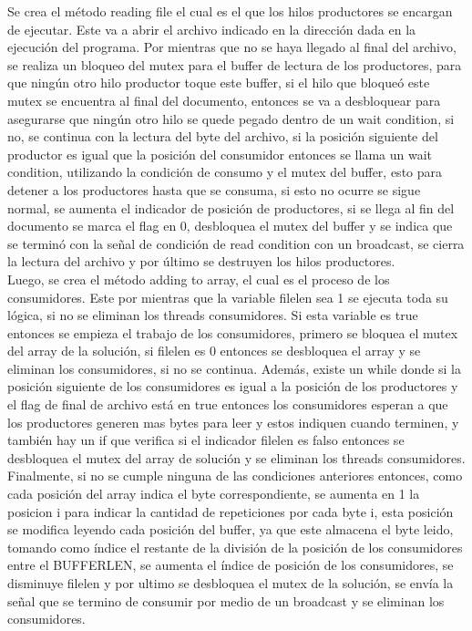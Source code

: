 \documentclass[10pt, article, natbib]{IEEEtran}
\begin{document}
Se crea el método reading file el cual es el que los hilos productores se encargan de ejecutar. Este va a abrir el archivo indicado en la dirección dada en la ejecución del programa.\cite{chanilastnam_2015_c} \cite{cppreferencecom_2021_fread} \cite{kerrisk_2010_fseek3} Por mientras que no se haya llegado al final del archivo, se realiza un bloqueo del mutex para el buffer de lectura de los productores, para que ningún otro hilo productor toque este buffer, si el hilo que bloqueó este mutex se encuentra al final del documento, entonces se va a desbloquear para asegurarse que ningún otro hilo se quede pegado dentro de un wait condition, si no, se continua con la lectura del byte del archivo, si la posición siguiente del productor es igual que la posición del consumidor entonces se llama un wait condition, utilizando la condición de consumo y el mutex del buffer, esto para detener a los productores hasta que se consuma, si esto no ocurre se sigue normal, se aumenta el indicador de posición de productores, si se llega al fin del documento se marca el flag en 0, desbloquea el mutex del buffer y se indica que se terminó con la señal de condición de read condition con un broadcast, se cierra la lectura del archivo y por último se destruyen los hilos productores.\cite{kerrisk_2010_pthread_exit3} \\

Luego, se crea el método adding to array, el cual es el proceso de los consumidores. Este por mientras que la variable filelen sea 1 se ejecuta toda su lógica, si no se eliminan los threads consumidores. Si esta variable es true entonces se empieza el trabajo de los consumidores, primero se bloquea el mutex del array de la solución, si filelen es 0 entonces se desbloquea el array y se eliminan los consumidores, si no se continua. Además, existe un while donde si la posición siguiente de los consumidores es igual a la posición de los productores y el flag de final de archivo está en true entonces los consumidores esperan a que los productores generen mas bytes para leer y estos indiquen cuando terminen, y también hay un if que verifica si el indicador filelen es falso entonces se desbloquea el mutex del array de solución y se eliminan los threads consumidores. Finalmente, si no se cumple ninguna de las condiciones anteriores entonces, como cada posición del array indica el byte correspondiente, se aumenta en 1 la posicion i para indicar la cantidad de repeticiones por cada byte i, esta posición se modifica leyendo cada posición del buffer, ya que este almacena el byte leido, tomando como índice el restante de la división de la posición de los consumidores entre el BUFFERLEN, se aumenta el índice de posición de los consumidores, se disminuye filelen y por ultimo se desbloquea el mutex de la solución, se envía la señal que se termino de consumir por medio de un broadcast y se eliminan los consumidores.\\
\end{document}

